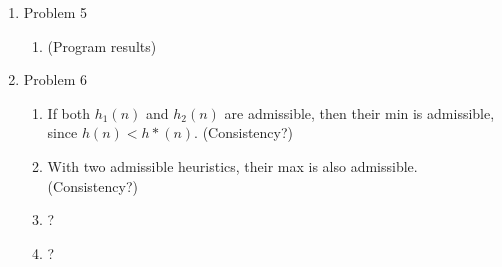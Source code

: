 \documentclass[11pt]{article}
\begin{document}
\begin{enumerate}
\item Problem 5
\begin{enumerate}
\item (Program results)
\end{enumerate}

\item Problem 6
\begin{enumerate}
\item If both $h_{1}(n)$ and $h_2(n)$ are admissible, then their min is admissible, since $h(n) < h*(n)$. (Consistency?)
\item With two admissible heuristics, their max is also admissible. (Consistency?)
\item ?
\item ?
\end{enumerate}


\end{enumerate}
\end{document}

